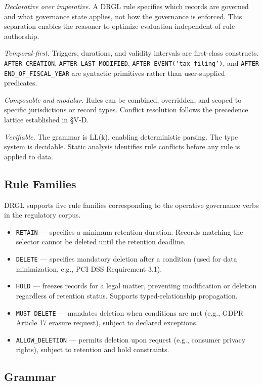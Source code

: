 \documentclass{ieeeaccess}
\begin{document}
\textit{Declarative over imperative.} A DRGL rule specifies which records are governed and what governance state applies, not how the governance is enforced. This separation enables the reasoner to optimize evaluation independent of rule authorship.

\textit{Temporal-first.} Triggers, durations, and validity intervals are first-class constructs. \texttt{AFTER CREATION}, \texttt{AFTER LAST\_MODIFIED}, \texttt{AFTER EVENT(`tax\_filing')}, and \texttt{AFTER END\_OF\_FISCAL\_YEAR} are syntactic primitives rather than user-supplied predicates.

\textit{Composable and modular.} Rules can be combined, overridden, and scoped to specific jurisdictions or record types. Conflict resolution follows the precedence lattice established in §V-D.

\textit{Verifiable.} The grammar is LL(k), enabling deterministic parsing. The type system is decidable. Static analysis identifies rule conflicts before any rule is applied to data.

\subsection{Rule Families}

DRGL supports five rule families corresponding to the operative governance verbs in the regulatory corpus.

\begin{itemize}
    \item \texttt{RETAIN} — specifies a minimum retention duration. Records matching the selector cannot be deleted until the retention deadline.
    \item \texttt{DELETE} — specifies mandatory deletion after a condition (used for data minimization, e.g., PCI DSS Requirement 3.1).
    \item \texttt{HOLD} — freezes records for a legal matter, preventing modification or deletion regardless of retention status. Supports typed-relationship propagation.
    \item \texttt{MUST\_DELETE} — mandates deletion when conditions are met (e.g., GDPR Article 17 erasure request), subject to declared exceptions.
    \item \texttt{ALLOW\_DELETION} — permits deletion upon request (e.g., consumer privacy rights), subject to retention and hold constraints.
\end{itemize}

\subsection{Grammar}
\end{document}
